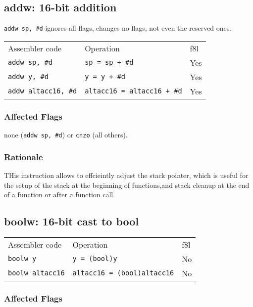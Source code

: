 \documentclass{book}
\begin{document}
\subsection{addw: 16-bit addition}

\texttt{addw sp, \#d} ignores all flags, changes no flags, not even the reserved ones.

\begin{tabular}{l l l}
Assembler code              & Operation                          & f8l \\
\texttt{addw sp, \#d}       & \texttt{sp = sp + \#d}             & Yes \\
\texttt{addw y, \#d}        & \texttt{y = y + \#d}               & Yes \\
\texttt{addw altacc16, \#d} & \texttt{altacc16 = altacc16 + \#d} & Yes
\end{tabular}

\subsubsection*{Affected Flags}

none (\texttt{addw sp, \#d}) or \texttt{cnzo} (all others).

\subsubsection*{Rationale}

THis instruction allows to effcieintly adjust the stack pointer, which is useful for the setup of the stack at the beginning of functions,and stack cleanup at the end of a function or after a function call.


\subsection{boolw: 16-bit cast to bool}

\begin{tabular}{l l l}
Assembler code          & Operation                          & f8l \\
\texttt{boolw y}        & \texttt{y = (bool)y}               & No \\
\texttt{boolw altacc16} & \texttt{altacc16 = (bool)altacc16} & No \\
\end{tabular}

\subsubsection*{Affected Flags}
\end{document}
